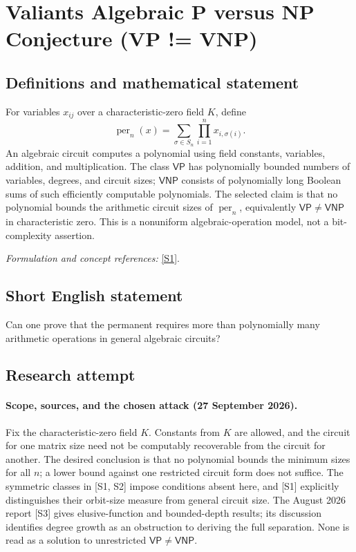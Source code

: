 \documentclass[11pt]{article}
\begin{document}
\section*{\texorpdfstring{Valiants Algebraic P versus NP Conjecture (VP != VNP)}{Valiants Algebraic P versus NP Conjecture (VP != VNP)}}\label{32}
\subsection{Definitions and mathematical statement}
For variables $x_{ij}$ over a characteristic-zero field $K$, define
\[
 \operatorname{per}_n(x)=\sum_{\sigma\in S_n}\prod_{i=1}^n x_{i,\sigma(i)}.
\]
An algebraic circuit computes a polynomial using field constants, variables, addition, and multiplication. The class $\mathsf{VP}$ has polynomially bounded numbers of variables, degrees, and circuit sizes; $\mathsf{VNP}$ consists of polynomially long Boolean sums of such efficiently computable polynomials. The selected claim is that no polynomial bounds the arithmetic circuit sizes of $\operatorname{per}_n$, equivalently $\mathsf{VP}\ne\mathsf{VNP}$ in characteristic zero. This is a nonuniform algebraic-operation model, not a bit-complexity assertion.
\par\smallskip\textit{Formulation and concept references:} \href{https://www.prateekdwivedi.in/papers/symACT-confversion.pdf}{[S1]}.

\subsection{Short English statement}
Can one prove that the permanent requires more than polynomially many arithmetic operations in general algebraic circuits?
\subsection{Research attempt}

\paragraph{Scope, sources, and the chosen attack (27 September 2026).}
Fix the characteristic-zero field $K$. Constants from $K$ are allowed,
and the circuit for one matrix size need not be computably recoverable
from the circuit for another. The desired conclusion is that no
polynomial bounds the minimum sizes for all $n$; a lower bound against
one restricted circuit form does not suffice.
The symmetric classes in [S1, S2] impose conditions absent here, and
[S1] explicitly distinguishes their orbit-size measure from general
circuit size. The August 2026 report [S3] gives elusive-function and
bounded-depth results; its discussion identifies degree growth as an
obstruction to deriving the full separation. None is read as a solution
to unrestricted $\mathsf{VP}\ne\mathsf{VNP}$.
\end{document}
